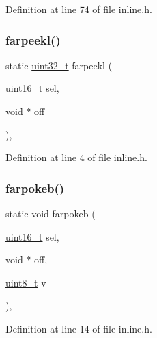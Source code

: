 Definition at line 74 of file inline.\+h.

\mbox{\label{a00035_aee0779a0581136320f91a72c4d6b5b90_aee0779a0581136320f91a72c4d6b5b90}} 
\subsubsection{\texorpdfstring{farpeekl()}{farpeekl()}}
{\footnotesize\ttfamily static \hyperlink{a00032_a435d1572bf3f880d55459d9805097f62_a435d1572bf3f880d55459d9805097f62}{uint32\+\_\+t} farpeekl (\begin{DoxyParamCaption}\item[{\hyperlink{a00032_a273cf69d639a59973b6019625df33e30_a273cf69d639a59973b6019625df33e30}{uint16\+\_\+t}}]{sel,  }\item[{void $\ast$}]{off }\end{DoxyParamCaption})\hspace{0.3cm}{\ttfamily [inline]}, {\ttfamily [static]}}



Definition at line 4 of file inline.\+h.

\mbox{\label{a00035_a4e7b04b927c6dca2d20f54a5c14a01d6_a4e7b04b927c6dca2d20f54a5c14a01d6}} 
\subsubsection{\texorpdfstring{farpokeb()}{farpokeb()}}
{\footnotesize\ttfamily static void farpokeb (\begin{DoxyParamCaption}\item[{\hyperlink{a00032_a273cf69d639a59973b6019625df33e30_a273cf69d639a59973b6019625df33e30}{uint16\+\_\+t}}]{sel,  }\item[{void $\ast$}]{off,  }\item[{\hyperlink{a00032_aba7bc1797add20fe3efdf37ced1182c5_aba7bc1797add20fe3efdf37ced1182c5}{uint8\+\_\+t}}]{v }\end{DoxyParamCaption})\hspace{0.3cm}{\ttfamily [inline]}, {\ttfamily [static]}}



Definition at line 14 of file inline.\+h.

